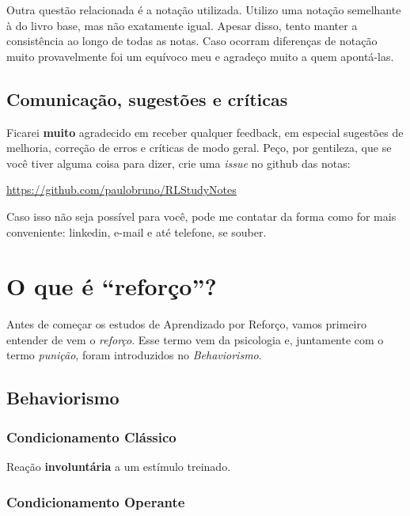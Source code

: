 \documentclass{article}
\begin{document}
            Outra questão relacionada é a notação utilizada. Utilizo uma notação semelhante à do livro base, mas não exatamente igual. Apesar disso, tento manter a consistência ao longo de todas as notas. Caso ocorram diferenças de notação muito provavelmente foi um equívoco meu e agradeço muito a quem apontá-las.
            
        \subsection{Comunicação, sugestões e críticas}
            
            Ficarei \textbf{muito} agradecido em receber qualquer feedback, em especial sugestões de melhoria, correção de erros e críticas de modo geral. Peço, por gentileza, que se você tiver alguma coisa para dizer, crie uma \emph{issue} no github das notas:
            
            \begin{center}
                \url{https://github.com/paulobruno/RLStudyNotes}
            \end{center}
            
            Caso isso não seja possível para você, pode me contatar da forma como for mais conveniente: linkedin, e-mail e até telefone, se souber.
            
    \section{O que é ``reforço''?}
    
        Antes de começar os estudos de Aprendizado por Reforço, vamos primeiro entender de vem o \emph{reforço}. Esse termo vem da psicologia e, juntamente com o termo \emph{punição}, foram introduzidos no \emph{Behaviorismo}.
    
        \subsection{Behaviorismo}
        
            \subsubsection{Condicionamento Clássico}
            
                Reação \textbf{involuntária} a um estímulo treinado.
            
            \subsubsection{Condicionamento Operante}
            
\end{document}
